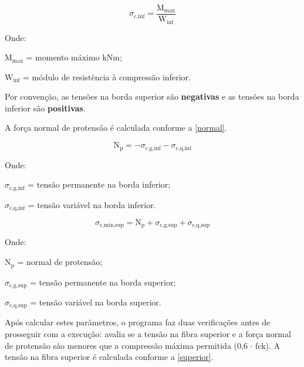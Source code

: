 \begin{equation}
	\label{tensao_inf}
	\sigma_{\text{c,inf}} = \frac{\text{M}_\text{max}}{\text{W}_\text{inf}}
\end{equation}

Onde:

\begin{alineas}[label=\textbullet]
	\item $ \text{M}_\text{max} $ = momento máximo {kNm};
	\item $ \text{W}_\text{inf} $ = módulo de resistência à compressão inferior.
\end{alineas}

Por convenção, as tensões na borda superior são \textbf{negativas} e as tensões na borda inferior são \textbf{positivas}.

A força normal de protensão é calculada conforme a \autoref{normal}.

\begin{equation}
	\label{normal}
	\text{N}_\text{p} = - \sigma_{\text{c,g,inf}} - \sigma_{\text{c,q,inf}}
\end{equation}

Onde:

\begin{alineas}[label=\textbullet]
	\item $ \sigma_{\text{c,g,inf}} $ = tensão permanente na borda inferior;
	\item $ \sigma_{\text{c,q,inf}} $ = tensão variável na borda inferior.
\end{alineas}

\begin{equation}
	\label{superior}
	\sigma_{\text{c,min,sup}} = \text{N}_\text{p} + \sigma_{\text{c,g,sup}} + \sigma_{\text{c,q,sup}}
\end{equation}

Onde:

\begin{alineas}[label=\textbullet]
	\item $ \text{N}_\text{p} $ = normal de protensão;
	\item $ \sigma_{\text{c,g,sup}} $ = tensão permanente na borda superior;
	\item $ \sigma_{\text{c,q,sup}} $ = tensão variável na borda superior.
\end{alineas}

Após calcular estes parâmetros, o programa faz duas verificações antes de prosseguir com a execução: avalia se a tensão na fibra superior e a força normal de protensão são menores que a compressão máxima permitida (0,6 $\cdot$ fck). A tensão na fibra superior é calculada conforme a \autoref{superior}.


